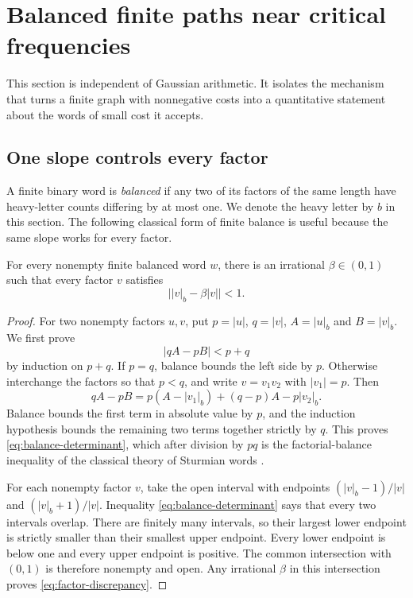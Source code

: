 \section{Balanced finite paths near critical frequencies}
\label{sec:balanced-stability}

This section is independent of Gaussian arithmetic. It isolates the
mechanism that turns a finite graph with nonnegative costs into a
quantitative statement about the words of small cost it accepts.

\subsection{One slope controls every factor}

A finite binary word is \emph{balanced} if any two of its factors of the
same length have heavy-letter counts differing by at most one. We denote
the heavy letter by $b$ in this section. The following classical form of
finite balance is useful because the same slope works for every factor.

\begin{lemma}
\label{lem:compatible-slope}
For every nonempty finite balanced word $w$, there is an irrational
$\beta\in(0,1)$ such that every factor $v$ satisfies
\begin{equation}
 \bigl||v|_b-\beta|v|\bigr|<1.
 \label{eq:factor-discrepancy}
\end{equation}
\end{lemma}

\begin{proof}
For two nonempty factors $u,v$, put $p=|u|$, $q=|v|$, $A=|u|_b$ and
$B=|v|_b$. We first prove
\begin{equation}
 |qA-pB|<p+q
 \label{eq:balance-determinant}
\end{equation}
by induction on $p+q$. If $p=q$, balance bounds the left side by $p$.
Otherwise interchange the factors so that $p<q$, and write $v=v_1v_2$
with $|v_1|=p$. Then
$$
 qA-pB=p(A-|v_1|_b)+(q-p)A-p|v_2|_b.
$$
Balance bounds the first term in absolute value by $p$, and the induction
hypothesis bounds the remaining two terms together strictly by $q$.
This proves \eqref{eq:balance-determinant}, which after division by $pq$
is the factorial-balance inequality of the classical theory of Sturmian
words \cite[Proposition 2.1.7]{Lothaire2002}.

For each nonempty factor $v$, take the open interval with endpoints
$(|v|_b-1)/|v|$ and $(|v|_b+1)/|v|$. Inequality
\eqref{eq:balance-determinant} says that every two intervals overlap.
There are finitely many intervals, so their largest lower endpoint is
strictly smaller than their smallest upper endpoint. Every lower endpoint
is below one and every upper endpoint is positive. The common intersection
with $(0,1)$ is therefore nonempty and open. Any irrational $\beta$ in
this intersection proves \eqref{eq:factor-discrepancy}.
\end{proof}

